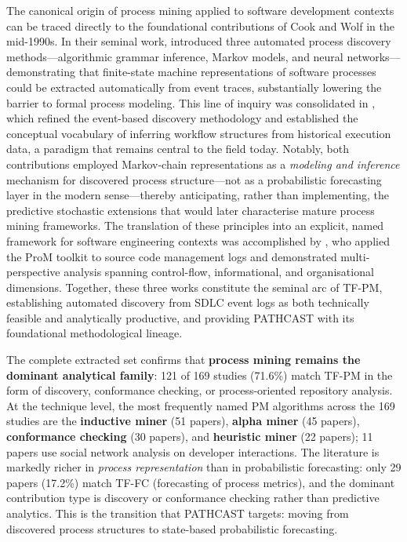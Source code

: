 The canonical origin of process mining applied to software development contexts
can be traced directly to the foundational contributions of Cook and Wolf in the
mid-1990s. In their seminal work, \cite{cook1995} introduced three automated
process discovery methods---algorithmic grammar inference, Markov models, and
neural networks---demonstrating that finite-state machine representations of
software processes could be extracted automatically from event traces,
substantially lowering the barrier to formal process modeling. This line of
inquiry was consolidated in \cite{cook1998}, which refined the event-based
discovery methodology and established the conceptual vocabulary of inferring
workflow structures from historical execution data, a paradigm that remains
central to the field today. Notably, both contributions employed Markov-chain
representations as a \emph{modeling and inference} mechanism for discovered
process structure---not as a probabilistic forecasting layer in the modern
sense---thereby anticipating, rather than implementing, the predictive
stochastic extensions that would later characterise mature process mining
frameworks. The translation of these principles into an
explicit, named framework for software engineering contexts was accomplished by
\cite{rubin2007}, who applied the ProM toolkit to source code management logs
and demonstrated multi-perspective analysis spanning control-flow, informational,
and organisational dimensions. Together, these three works constitute the seminal
arc of TF-PM, establishing automated discovery from SDLC event logs as both
technically feasible and analytically productive, and providing PATHCAST with
its foundational methodological lineage.

The complete extracted set confirms that \textbf{process mining remains the
dominant analytical family}: 121 of 169 studies (71.6\%) match TF-PM in the
form of discovery, conformance checking, or process-oriented repository
analysis. At the technique level, the most frequently named PM algorithms
across the 169 studies are the \textbf{inductive miner} (51 papers),
\textbf{alpha miner} (45 papers), \textbf{conformance checking} (30 papers),
and \textbf{heuristic miner} (22 papers); 11 papers use social network
analysis on developer interactions. The literature is markedly richer in
\emph{process representation} than in probabilistic forecasting: only 29
papers (17.2\%) match TF-FC (forecasting of process metrics), and the dominant
contribution type is discovery or conformance checking rather than predictive
analytics. This is the transition that PATHCAST targets: moving from
discovered process structures to state-based probabilistic forecasting.

